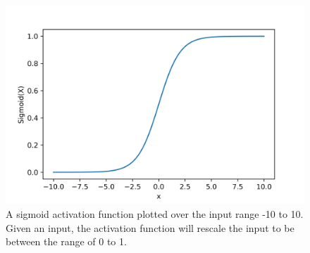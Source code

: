 \begin{figure}
    \centering
    \includegraphics[width=\linewidth]{figures/sigmoid_function.png}
    \caption[Sigmoid activation function illustration.]{A sigmoid activation function plotted over the input range -10 to 10. Given an input, the activation function will rescale the input to be between the range of 0 to 1.~}
    \label{fig:sigmoid}
\end{figure}


